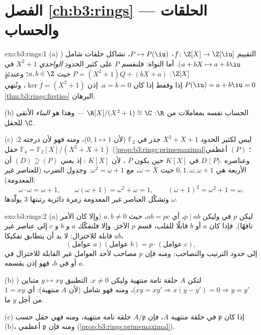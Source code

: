 \section*{الفصل \ref{ch:b3:rings} --- الحلقات والحساب}

\begin{solution}{exo:b3:rings:1}
(a) التقييم $f \colon \Z[X] \to \Z[\iu]$، $P \mapsto P(\iu)$، تشاكل حلقات شامل ($a + bX \mapsto a + b\iu$). أما النواة:
فلنقسم $P$ على كثير الحدود \emph{الواحدي} $X^2 + 1$ في $\Z[X]$:
$P = (X^2 +
1)Q + (bX + a)$ حيث $a, b \in \Z$؛ وعندئذٍ $P(\iu) = a + b\iu = 0$ إذا وفقط إذا كان
$a = b = 0$. إذن $\ker f = (X^2+1)$، وتُنهي \cref{thm:b3:rings:firstiso} البرهان.

(b) الحساب نفسه بمعاملات من $\R$: $\R[X]/(X^2+1)
\cong \C$ --- وهذا هو
\emph{البناء} الأنقى للحقل $\C$.

(c) ليس لكثير الحدود $X^2 + X + 1$ جذر في $\mathbb F_2$ (لأن
$0, 1 \mapsto 1$)، ومنه فهو  لأن درجته $2$:
 $\mathbb
F_4 = \mathbb F_2[X]/(X^2+X+1)$ حقل (\cref{prop:b3:rings:primemaximal}؛  $(P)$ أعظمي في
$K[X]$ حين يكون $P$ ، لأن $K[X]$ : إذ يعني  $(D) \supseteq
(P)$ أن $D \mid P$). وعناصره الأربعة هي
$0, 1, \omega,
\omega + 1$ حيث $\omega = \bar X$، مع $\omega^2 = \omega + 1$. وجدول الضرب (للعناصر غير
المعدومة):
\[
\omega \cdot \omega = \omega + 1, \qquad
\omega(\omega + 1) = \omega^2 + \omega = 1, \qquad
(\omega+1)^2 = \omega^2 + 1 = \omega .
\]
وتشكّل العناصر غير المعدومة زمرة دائرية رتبتها $3$ يولّدها
$\omega$.
\end{solution}

\begin{solution}{exo:b3:rings:2}
(a) ليكن $p$  في  وليكن
$p \mid ab$، أي $ab =
pc$، حيث $a, b \neq 0$ (وإلا كان الأمر
تافهًا). فإذا كان $a$ أو $b$ قابلًا للقلب، قسم $p$ الآخرَ. وإلا
فلنفكّك $a$ و $b$ و $c$ إلى عناصر غير قابلة للاختزال: لا بد أن
يتطابق تفكيكا $ab$،
\[
(\text{عوامل } a)(\text{عوامل } b) = p \cdot
(\text{عوامل } c),
\]
إلى حدود الترتيب والتصاحب: ومنه فإن $p$ مصاحب لأحد العوامل غير
القابلة للاختزال في $a$ أو في $b$، فهو إذن يقسمه.

(b) لتكن $A$ حلقة تامة منتهية وليكن $x \neq 0$. التطبيق $y \mapsto
xy$
متباين ($xy = xy' \Rightarrow x(y - y') = 0 \Rightarrow
y = y'$)، ومنه فهو شامل (لأن $A$ منتهية): أي $1 = xy$ من
أجل $y$ ما.

(c) إذا كان $\mathfrak p$  في حلقة منتهية $A$، فإن
$A/\mathfrak p$ حلقة تامة منتهية، ومنه فهي حقل حسب (b)، ومنه فإن
$\mathfrak p$ أعظمي (\cref{prop:b3:rings:primemaximal}).
\end{solution}

